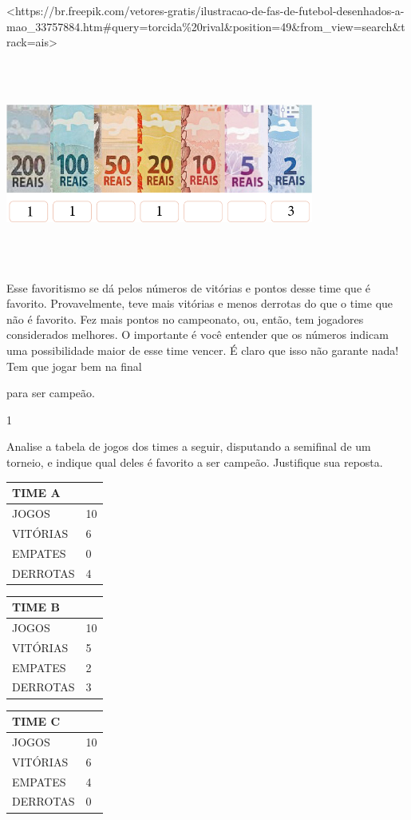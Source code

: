 {{{{{{{{{{{{{\textless{}https://br.freepik.com/vetores-gratis/ilustracao-de-fas-de-futebol-desenhados-a-mao\_33757884.htm\#query=torcida\%20rival\&position=49\&from\_view=search\&track=ais\textgreater{}

\includegraphics[width=3.98958in,height=2.65972in]{media/image83.png}

Esse favoritismo se dá pelos números de vitórias e
pontos desse time que é favorito. Provavelmente, teve mais vitórias e
menos derrotas do que o time que não é favorito. Fez mais pontos no
campeonato, ou, então, tem jogadores considerados melhores. O importante é você
entender que os números indicam uma possibilidade maior de esse time
vencer. É claro que isso não garante nada! Tem que jogar bem na final

para ser campeão.


\num{1}

Analise a tabela de jogos dos times a seguir, disputando a semifinal de um
torneio, e indique qual deles é favorito a ser campeão. Justifique sua reposta.

\begin{longtable}[]{@{}ll@{}}
\toprule
TIME A\tabularnewline
\midrule
\endhead
JOGOS & 10\tabularnewline
VITÓRIAS & 6\tabularnewline
EMPATES & 0\tabularnewline
DERROTAS & 4\tabularnewline
\bottomrule
\end{longtable}

\begin{longtable}[]{@{}ll@{}}
\toprule
TIME B\tabularnewline
\midrule
\endhead
JOGOS & 10\tabularnewline
VITÓRIAS & 5\tabularnewline
EMPATES & 2\tabularnewline
DERROTAS & 3\tabularnewline
\bottomrule
\end{longtable}

\begin{longtable}[]{@{}ll@{}}
\toprule
TIME C\tabularnewline
\midrule
\endhead
JOGOS & 10\tabularnewline
VITÓRIAS & 6\tabularnewline
EMPATES & 4\tabularnewline
DERROTAS & 0\tabularnewline
\bottomrule
\end{longtable}

}}}}}}}}}}}}}

